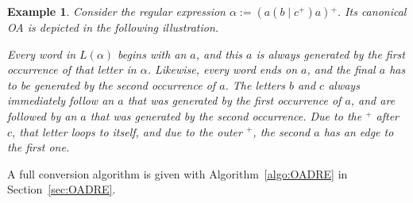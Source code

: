 \documentclass[a4paper,11pt, svgnames,titlepage]{article}
\newcommand{\rxp}{{^\mathtt{+}}}
\DeclareMathOperator{\ror}{\mathtt{|}}
\newcommand{\df}{:=}
\newtheorem{example}{Example}
\begin{document}
\begin{example}\label{ex:oa}
Consider the regular expression $\alpha\df (a(b\ror c\rxp)a)\rxp$. Its canonical OA is depicted in the following illustration.
\begin{center}
	
\end{center}
Every word in $L(\alpha)$ begins with an $a$, and this $a$ is always generated by the first occurrence of that letter in $\alpha$. Likewise, every word ends on $a$, and the final $a$ has to be generated by the second occurrence of $a$. The letters $b$ and $c$ always immediately follow an $a$ that was generated by the first occurrence of $a$, and are followed by an $a$ that was generated by the second occurrence. Due to the $\rxp$ after $c$, that letter loops to itself, and due to the outer $\rxp$, the second $a$ has an edge to the first one.
\end{example}

A full conversion algorithm is given with Algorithm~\ref{algo:OADRE} in Section~\ref{sec:OADRE}.
\end{document}
